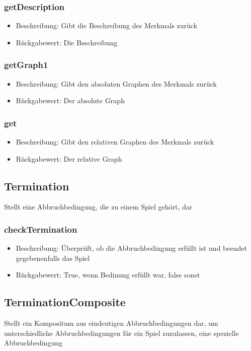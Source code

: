 \documentclass[a4paper]{scrreprt}
\begin{document}
   \subsubsection{getDescription}
      \begin{itemize}
          \item Beschreibung: Gibt die Beschreibung des Merkmals zurück
          \item Rückgabewert: Die Beschreibung
      \end{itemize}
   \subsubsection{getGraph1}
      \begin{itemize}
          \item Beschreibung: Gibt den absoluten Graphen des Merkmals zurück
          \item Rückgabewert: Der absolute Graph
      \end{itemize}
   \subsubsection{get}
      \begin{itemize}
          \item Beschreibung: Gibt den relativen Graphen des Merkmals zurück
          \item Rückgabewert: Der relative Graph
      \end{itemize}
   
   \subsection{Termination}
   Stellt eine Abbruchbedingung, die zu einem Spiel gehört, dar
   \subsubsection{checkTermination}
      \begin{itemize}
          \item Beschreibung: Überprüft, ob die Abbruchbedingung erfüllt ist und beendet gegebenenfalls das Spiel
          \item Rückgabewert: True, wenn Bedinung erfüllt war, false sonst
      \end{itemize}
   
   \subsection{TerminationComposite}
   Stellt ein Kompositum aus eindeutigen Abbruchbedingungen dar, um unterschiedliche Abbruchbedingungen für ein Spiel zuzulassen, eine spezielle Abbruchbedingung
\end{document}
